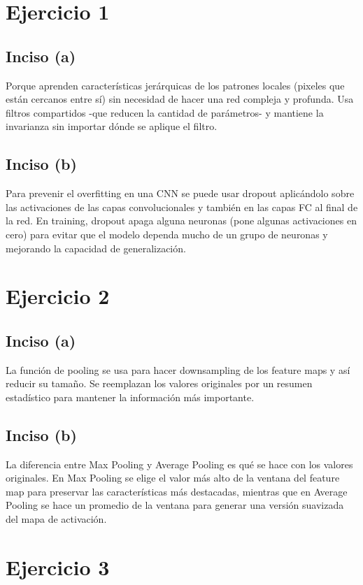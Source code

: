\documentclass[12pt, a4paper]{article}
\begin{document}
    \section*{Ejercicio 1}
        \subsection*{Inciso (a)}
            \noindent Porque aprenden características jerárquicas de los patrones locales (pixeles que están cercanos entre sí) sin necesidad de hacer una red compleja y profunda. Usa filtros compartidos -que reducen la cantidad de parámetros- y mantiene la invarianza sin importar dónde se aplique el filtro.
        \subsection*{Inciso (b)}
            \noindent Para prevenir el overfitting en una CNN se puede usar dropout aplicándolo sobre las activaciones de las capas convolucionales y también en las capas FC al final de la red. En training, dropout apaga alguna neuronas (pone algunas activaciones en cero) para evitar que el modelo dependa mucho de un grupo de neuronas y mejorando la capacidad de generalización.
    \section*{Ejercicio 2}
        \subsection*{Inciso (a)}
            \noindent La función de pooling se usa para hacer downsampling de los feature maps y así reducir su tamaño. Se reemplazan los valores originales por un resumen estadístico para mantener la información más importante.
        \subsection*{Inciso (b)}
            \noindent La diferencia entre Max Pooling y Average Pooling es qué se hace con los valores originales. En Max Pooling se elige el valor más alto de la ventana del feature map para preservar las características más destacadas, mientras que en Average Pooling se hace un promedio de la ventana para generar una versión suavizada del mapa de activación.
    \section*{Ejercicio 3}
\end{document}
